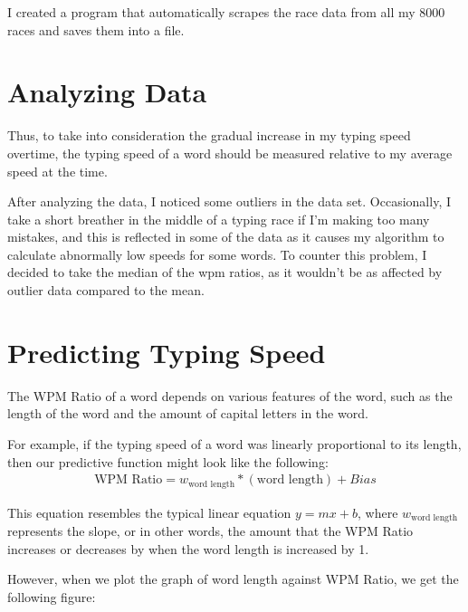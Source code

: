 \documentclass[12pt, demo]{article}
\begin{document}
I created a program that automatically scrapes the race data from all my 8000 races and saves them into a file.


\section*{Analyzing Data}

Thus, to take into consideration the gradual increase in my typing speed overtime, the typing speed of a word should be measured relative to my average speed at the time.

After analyzing the data, I noticed some outliers in the data set. Occasionally, I take a short breather in the middle of a typing race if I'm making too many mistakes, and this is reflected in some of the data as it causes my algorithm to calculate abnormally low speeds for some words. To counter this problem, I decided to take the median of the wpm ratios, as it wouldn't be as affected by outlier data compared to the mean.

\section*{Predicting Typing Speed}

The WPM Ratio of a word depends on various features of the word, such as the length of the word and the amount of capital letters in the word.

For example, if the typing speed of a word was linearly proportional to its length, then our predictive function might look like the following:
\begin{align}
	\text{WPM Ratio} = w_{\text{word length}} * (\text{word length}) + Bias
\end{align}

This equation resembles the typical linear equation $y = mx + b$, where $w_{\text{word length}}$ represents the slope, or in other words, the amount that the WPM Ratio increases or decreases by when the word length is increased by 1.

However, when we plot the graph of word length against WPM Ratio, we get the following figure:
\end{document}

